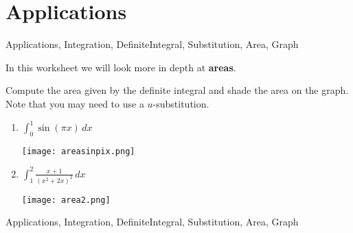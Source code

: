 

\section{Applications}


\begin{tagblock}{Applications, Integration, DefiniteIntegral, Substitution, Area, Graph}
\begin{question}
	


In this worksheet we will look more in depth at \textbf{areas}.

Compute the area given by the definite integral and shade the area on the graph.  Note that you may need to use a $u$-substitution.
\begin{enumerate}
\item $\displaystyle \int_0^1 \sin(\pi x) \, dx$

\texttt{[image: areasinpix.png]}

\vspace{1in}


\item $\displaystyle \int_1^2 \frac{x+1}{(x^2+2x)^2} \, dx$

\texttt{[image: area2.png]}

\end{enumerate}

    
\begin{tags}
       Applications, Integration, DefiniteIntegral, Substitution, Area, Graph
\end{tags}
    
\begin{diary}
\end{diary}
	
\begin{solution}

\end{solution}
	
\end{question}

\end{tagblock}

